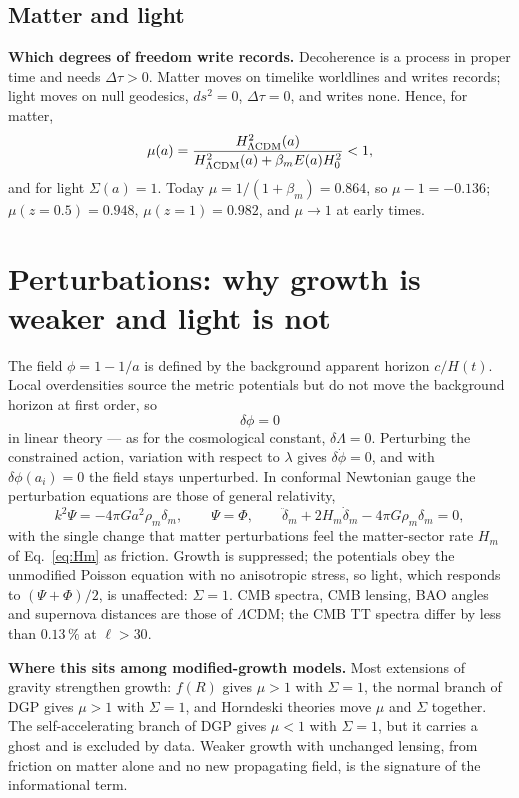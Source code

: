 \subsection{Matter and light}
\textbf{Which degrees of freedom write records.} Decoherence is a process in proper time and needs $\Delta\tau>0$. Matter moves on timelike worldlines and
writes records; light moves on null geodesics, $ds^2=0$, $\Delta\tau=0$, and writes none. Hence, for matter,
\begin{equation}
\mu(a)=\frac{H^2_{\Lambda{\rm CDM}}(a)}{H^2_{\Lambda{\rm CDM}}(a)+\beta_mE(a)H_0^2}<1, \label{eq:mu}
\end{equation}
and for light $\Sigma(a)=1$. Today $\mu=1/(1+\beta_m)=0.864$, so $\mu-1=-0.136$; $\mu(z{=}0.5)=0.948$, $\mu(z{=}1)=0.982$, and $\mu\to1$ at early times.

\section{Perturbations: why growth is weaker and light is not}\label{sec:perturbations}
The field $\phi=1-1/a$ is defined by the background apparent horizon $c/H(t)$. Local overdensities source the metric potentials but do not move the
background horizon at first order, so
\begin{equation}
\delta\phi=0
\end{equation}
in linear theory --- as for the cosmological constant, $\delta\Lambda=0$. Perturbing the constrained action, variation with respect to $\lambda$ gives
$\delta\dot\phi=0$, and with $\delta\phi(a_i)=0$ the field stays unperturbed. In conformal Newtonian gauge the perturbation equations are those of general
relativity,
\begin{equation}
k^2\Psi=-4\pi Ga^2\rho_m\delta_m,\qquad \Psi=\Phi,\qquad \ddot\delta_m+2H_m\dot\delta_m-4\pi G\rho_m\delta_m=0,
\end{equation}
with the single change that matter perturbations feel the matter-sector rate $H_m$ of Eq.~\eqref{eq:Hm} as friction. Growth is suppressed; the potentials
obey the unmodified Poisson equation with no anisotropic stress, so light, which responds to $(\Psi+\Phi)/2$, is unaffected: $\Sigma=1$. CMB spectra, CMB
lensing, BAO angles and supernova distances are those of $\Lambda$CDM; the CMB TT spectra differ by less than $0.13\,\%$ at $\ell>30$.

\textbf{Where this sits among modified-growth models.} Most extensions of gravity strengthen growth: $f(R)$ gives $\mu>1$ with $\Sigma=1$, the normal branch
of DGP gives $\mu>1$ with $\Sigma=1$, and Horndeski theories move $\mu$ and $\Sigma$ together. The self-accelerating branch of DGP gives $\mu<1$ with $\Sigma=1$,
but it carries a ghost and is excluded by data. Weaker growth with unchanged lensing, from friction on matter alone and no new propagating field, is
the signature of the informational term.

